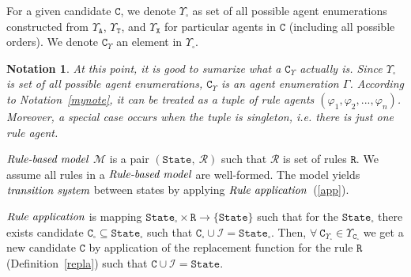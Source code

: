 \documentclass{entcs}
\renewcommand{\~}[0]{\texttildelow}
\newtheorem{notation}[thm]{Notation}
\begin{document}
\begin{defn}
For a given candidate $\mathtt{C}$, we denote $\Upsilon_{\square}$ as set of all possible agent enumerations constructed from $\Upsilon_\mathtt{A}$, $\Upsilon_\mathtt{T}$, and $\Upsilon_\mathtt{X}$ for particular agents in $\mathtt{C}$ (including all possible orders). We denote $\mathtt{C}_\Upsilon$ an element in $\Upsilon_{\square}$.
\end{defn}

\begin{notation}
At this point, it is good to sumarize what a $\mathtt{C}_\Upsilon$ actually is. Since $\Upsilon_{\square}$ is set of all possible agent enumerations, $\mathtt{C}_\Upsilon$ is an agent enumeration $\Gamma$. According to Notation~\ref{mynote}, it can be treated as a tuple of rule agents $(\varphi_1, \varphi_2, ..., \varphi_n)$. Moreover, a special case occurs when the tuple is singleton, i.e. there is just one rule agent.
\end{notation}

\begin{defn}
$\emph{Rule-based model}$ $\mathcal{M}$ is a pair $ (\mathtt{State},~\mathcal{R}) $ such that $\mathcal{R}$ is set of rules $\mathtt{R}$. We assume all rules in a $\emph{Rule-based model}$ are well-formed. The model yields $\emph{transition system}$ between states by applying $\emph{Rule application}$~(\ref{app}).
\end{defn}

\begin{defn} \label{app}
$\emph{Rule application}$ is mapping $\mathtt{State}_{\square} \times \mathtt{R} \rightarrow \{\mathtt{State}\}$ such that for the $\mathtt{State}_{\square}$ there exists candidate $\mathtt{C}_{\square} \subseteq \mathtt{State}_{\square}$ such that $\mathtt{C}_{\square} \cup \mathcal{I} = \mathtt{State}_{\square}$. Then, $\forall ~\mathtt{C}_{\Upsilon_{\square}} \in \Upsilon_{\mathtt{C}_{\square}}$ we get a new candidate $\mathtt{C}$ by application of the replacement function for the rule $\mathtt{R}$ (Definition~\ref{repla}) such that $\mathtt{C} \cup \mathcal{I} = \mathtt{State}$.
\end{defn}
\end{document}
